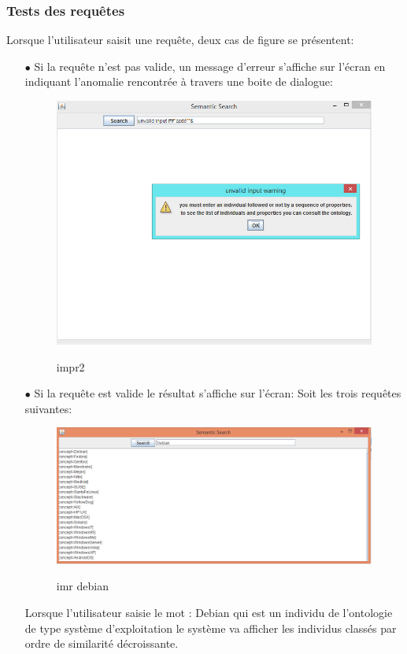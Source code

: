         \subsubsection{Tests des requêtes}
            Lorsque l'utilisateur saisit une requête, deux cas de figure se présentent:\\
            \begin{itemize}
                \item[\quad $\bullet$]Si la requête n'est pas valide, un message d'erreur s'affiche sur l'écran en indiquant l'anomalie rencontrée à travers une boite de dialogue:
                    \begin{figure}[H]
                    \centering
                    \includegraphics[width=14cm]{impr2}\\
                    \caption{impr2}\label{impr2}
                     \end{figure}
                \item[\quad $\bullet$]Si la requête est valide le résultat s'affiche sur l'écran:
                Soit les trois requêtes suivantes:
                    \begin{figure}[H]
                    \centering
                    \includegraphics[width=15cm]{imr_debian}\\
                    \caption{imr debian}\label{imr debian}
                    \end{figure}
                     Lorsque l'utilisateur saisie le mot : Debian qui est un individu de l'ontologie de type système d'exploitation le système va afficher les individus classés par ordre de similarité décroissante.


\end{itemize}
